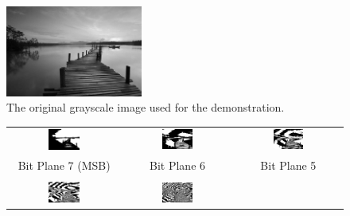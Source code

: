 \documentclass{article}
\begin{document}
\begin{figure}[H]
    \centering
    \includegraphics[width=0.4\textwidth]{images/original_image.png}
    \caption{The original grayscale image used for the demonstration.}
    \label{fig:original}
\end{figure}

\begin{figure}[H]
    \centering
    \begin{tabular}{ccc}
        \includegraphics[width=0.3\textwidth]{images/bit_plane_7.png} &
        \includegraphics[width=0.3\textwidth]{images/bit_plane_6.png} &
        \includegraphics[width=0.3\textwidth]{images/bit_plane_5.png} \\
        Bit Plane 7 (MSB) & Bit Plane 6 & Bit Plane 5 \\
        \\
        \includegraphics[width=0.3\textwidth]{images/bit_plane_4.png} &
        \includegraphics[width=0.3\textwidth]{images/bit_plane_3.png} &

\end{tabular}
\end{figure}
\end{document}
